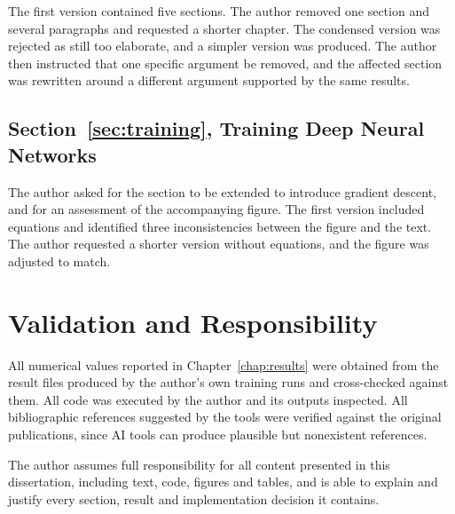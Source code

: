 The first version contained five sections. The author removed one section and several paragraphs and
requested a shorter chapter. The condensed version was rejected as still too elaborate, and a simpler
version was produced. The author then instructed that one specific argument be removed, and the affected
section was rewritten around a different argument supported by the same results.

\subsection*{Section~\ref{sec:training}, Training Deep Neural Networks}

The author asked for the section to be extended to introduce gradient descent, and for an assessment of
the accompanying figure. The first version included equations and identified three inconsistencies between
the figure and the text. The author requested a shorter version without equations, and the figure was
adjusted to match.

\section{Validation and Responsibility}

All numerical values reported in Chapter~\ref{chap:results} were obtained from the result files produced
by the author's own training runs and cross-checked against them. All code was executed by the author and
its outputs inspected. All bibliographic references suggested by the tools were verified against the
original publications, since AI tools can produce plausible but nonexistent references.

The author assumes full responsibility for all content presented in this dissertation, including text,
code, figures and tables, and is able to explain and justify every section, result and implementation
decision it contains.